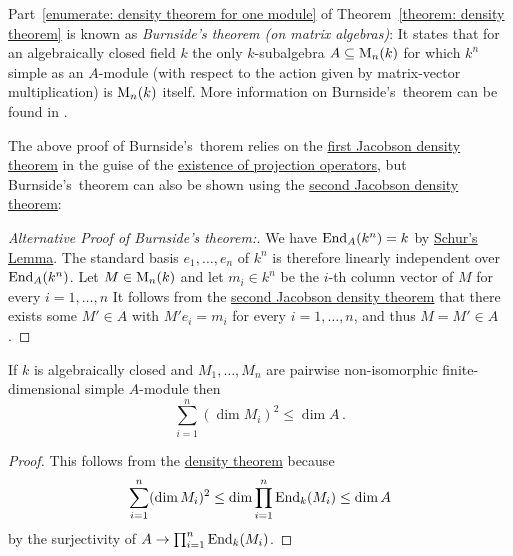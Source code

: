 


\begin{remark}
  Part~\ref*{enumerate: density theorem for one module} of Theorem~\ref{theorem: density theorem} is known as \emph{Burnside’s theorem \textup(on matrix algebras\textup)}:
  It states that for an algebraically closed field $k$ the only $k$-subalgebra $A \subseteq \operatorname{M}_n(k)$ for which $k^n$ simple as an $A$-module (with respect to the action given by matrix-vector multiplication) is $\operatorname{M}_n(k)$ itself.
  More information on Burnside’s~theorem can be found in \cite{ShapiroBurnside}.
  
  The above proof of Burnside’s~thorem  relies on the \hyperref[theorem: first jacobson density theorem]{first Jacobson density theorem} in the guise of the \hyperref[corollary: existence of projection operators]{existence of projection operators}, but Burnside’s~theorem can also be shown using the \hyperref[theorem: second jacobson density theorem]{second Jacobson density theorem}:
\end{remark}


\begin{proof}[Alternative Proof of Burnside’s theorem:]
  We have $\operatorname{End}_A(k^n) = k$ by \hyperref[proposition: schurs lemma for modules]{Schur’s Lemma}.
  The standard basis $e_1, \dotsc, e_n$ of $k^n$ is therefore linearly independent over $\operatorname{End}_A(k^n)$.
  Let $M \in \operatorname{M}_n(k)$ and let $m_i \in k^n$ be the $i$-th column vector of $M$ for every $i = 1, \dotsc, n$
  It follows from the \hyperref[theorem: second jacobson density theorem]{second Jacobson density theorem} that there exists some $M' \in A$ with $M' e_i = m_i$ for every $i = 1, \dotsc, n$, and thus $M = M' \in A$.
\end{proof}




\begin{corollary}
  \label{corollary: dimension simple algebra modules}
  If $k$ is algebraically closed and $M_1, \dotsc, M_n$ are pairwise non-iso\-morphic finite-dimensional simple $A$-module then
  \[
          \sum_{i=1}^n (\dim M_i)^2
    \leq  \dim A \,.
  \]
\end{corollary}


\begin{proof}
  This follows from the \hyperref[theorem: density theorem]{density theorem} because
  \[
          \sum_{i=1}^n (\dim M_i)^2
    \leq  \dim \prod_{i=1}^n \operatorname{End}_k(M_i)
    \leq  \dim A
  \]
  by the surjectivity of $A \to \prod_{i=1}^n \operatorname{End}_k(M_i)$.
\end{proof}


